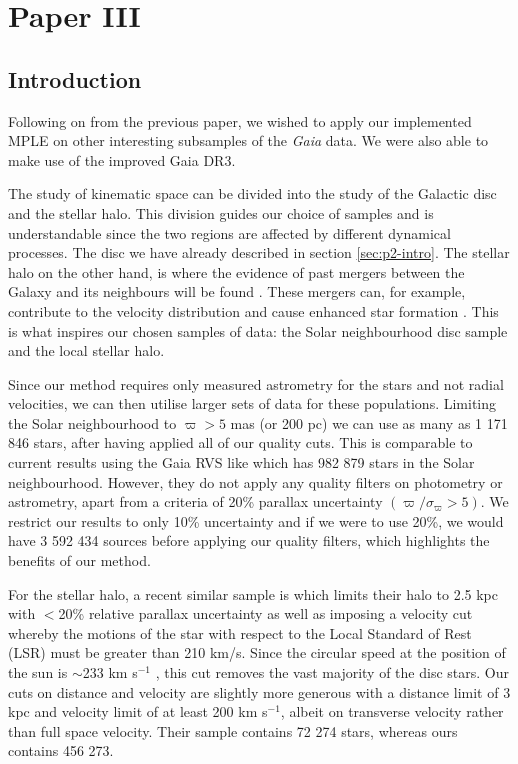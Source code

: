 \chapter{Paper III}\label{chap:paper3}
\section{Introduction}\label{sec:p3-intro}
Following on from the previous paper, we wished to apply our implemented MPLE on other interesting subsamples of the \textit{Gaia} data. We were also able to make use of the improved Gaia DR3. 

The study of kinematic space can be divided into the study of the Galactic disc and the stellar halo. This division guides our choice of samples and is understandable since the two regions are affected by different dynamical processes. The disc we have already described in section \ref{sec:p2-intro}. The stellar halo on the other hand, is where the evidence of past mergers between the Galaxy and its neighbours will be found \citep{helmi:20}. These mergers can, for example, contribute to the velocity distribution and cause enhanced star formation \citep{ruiz-lara:20}. This is what inspires our chosen samples of data: the Solar neighbourhood disc sample and the local stellar halo.

Since our method requires only measured astrometry for the stars and not radial velocities, we can then utilise larger sets of data for these populations. Limiting the Solar neighbourhood to $\varpi > 5$ mas (or 200 pc) we can use as many as 1 171 846 stars, after having applied all of our quality cuts. This is comparable to current results using the Gaia RVS like \cite{lucchini:22} which has 982 879 stars in the Solar neighbourhood. However, they do not apply any quality filters on photometry or astrometry, apart from a criteria of 20\% parallax uncertainty $(\varpi / \sigma_\varpi > 5)$. We restrict our results to only 10\% uncertainty and if we were to use 20\%, we would have 3 592 434 sources before applying our quality filters, which highlights the benefits of our method.

For the stellar halo, a recent similar sample is \cite{dodd:22} which limits their halo to 2.5 kpc with $<$20\% relative parallax uncertainty as well as imposing a velocity cut whereby the motions of the star with respect to the Local Standard of Rest (LSR) must be greater than 210 km/s. Since the circular speed at the position of the sun is ${\sim}$233 km s$^{-1}$ \citep{mcmillan:17}, this cut removes the vast majority of the disc stars. Our cuts on distance and velocity are slightly more generous with a distance limit of 3 kpc and velocity limit of at least 200 km s$^{-1}$, albeit on transverse velocity rather than full space velocity. Their sample contains 72 274 stars, whereas ours contains 456 273. 

